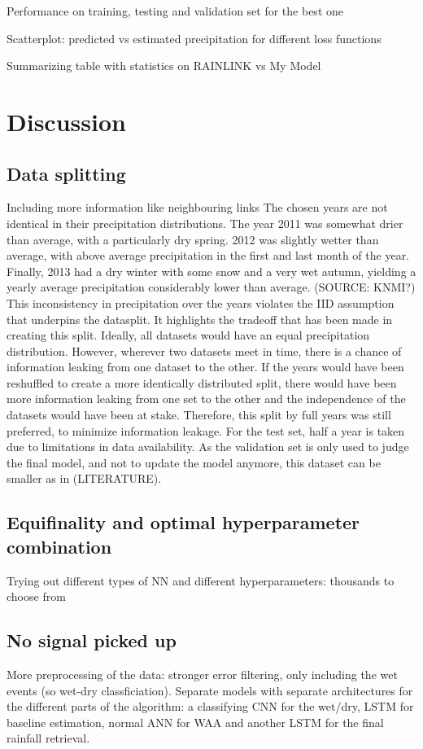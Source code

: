 \documentclass[twocolumn, 10pt, a4paper]{memoir}
\begin{document}
	Performance on training, testing and validation set for the best one
	
	Scatterplot: predicted vs estimated precipitation for different loss functions
	
	Summarizing table with statistics on RAINLINK vs My Model
	
	\section{Discussion} \label{ch: discussion}
	\subsection{Data splitting} \label{sec: datasplitting}
	Including more information like neighbouring links
	The chosen years are not identical in their precipitation distributions. The year 2011 was somewhat drier than average, with a particularly dry spring. 2012 was slightly wetter than average, with above average precipitation in the first and last month of the year. Finally, 2013 had a dry winter with some snow and a very wet autumn, yielding a yearly average precipitation considerably lower than average. (SOURCE: KNMI?)  
	This inconsistency in precipitation over the years violates the IID assumption that underpins the datasplit. It highlights the tradeoff that has been made in creating this split. Ideally, all datasets would have an equal precipitation distribution. However, wherever two datasets meet in time, there is a chance of information leaking from one dataset to the other. If the years would have been reshuffled to create a more identically distributed split, there would have been more information leaking from one set to the other and the independence of the datasets would have been at stake. Therefore, this split by full years was still preferred, to minimize information leakage. For the test set, half a year is taken due to limitations in data availability. As the validation set is only used to judge the final model, and not to update the model anymore, this dataset can be smaller as in (LITERATURE).
	
	\subsection{Equifinality and optimal hyperparameter combination} \label{sec: Equifinality}
	Trying out different types of NN and different hyperparameters: thousands to choose from
	
	\subsection{No signal picked up} \label{sec: no results}
	More preprocessing of the data: stronger error filtering, only including the wet events (so wet-dry classficiation). Separate models with separate architectures for the different parts of the algorithm: a classifying CNN for the wet/dry, LSTM for baseline estimation, normal ANN for WAA and another LSTM for the final rainfall retrieval.
	
\end{document}
